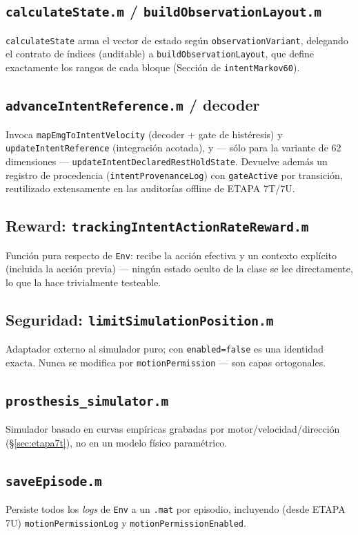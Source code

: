 \documentclass[11pt,a4paper]{article}
\begin{document}
\subsection{\texttt{calculateState.m} / \texttt{buildObservationLayout.m}}
\texttt{calculateState} arma el vector de estado según \texttt{observationVariant},
delegando el contrato de índices (auditable) a \texttt{buildObservationLayout}, que
define exactamente los rangos de cada bloque (Sección de \texttt{intentMarkov60}).

\subsection{\texttt{advanceIntentReference.m} / decoder}
Invoca \texttt{mapEmgToIntentVelocity} (decoder + gate de histéresis) y
\texttt{updateIntentReference} (integración acotada), y --- sólo para la variante de
62 dimensiones --- \texttt{updateIntentDeclaredRestHoldState}. Devuelve además un
registro de procedencia (\texttt{intentProvenanceLog}) con \texttt{gateActive} por
transición, reutilizado extensamente en las auditorías offline de ETAPA 7T/7U.

\subsection{Reward: \texttt{trackingIntentActionRateReward.m}}
Función pura respecto de \texttt{Env}: recibe la acción efectiva y un contexto
explícito (incluida la acción previa) --- ningún estado oculto de la clase se lee
directamente, lo que la hace trivialmente testeable.

\subsection{Seguridad: \texttt{limitSimulationPosition.m}}
Adaptador externo al simulador puro; con \texttt{enabled=false} es una identidad
exacta. Nunca se modifica por \texttt{motionPermission} --- son capas ortogonales.

\subsection{\texttt{prosthesis\_simulator.m}}
Simulador basado en curvas empíricas grabadas por motor/velocidad/dirección
(\S\ref{sec:etapa7t}), no en un modelo físico paramétrico.

\subsection{\texttt{saveEpisode.m}}
Persiste todos los \emph{logs} de \texttt{Env} a un \texttt{.mat} por episodio,
incluyendo (desde ETAPA 7U) \texttt{motionPermissionLog} y
\texttt{motionPermissionEnabled}.
\end{document}
